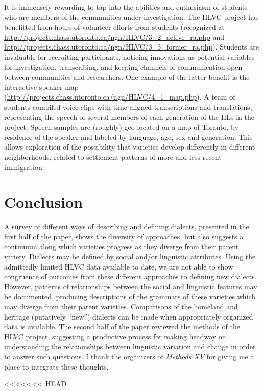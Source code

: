 \documentclass[output=paper]{LSP/langsci}
\begin{document}
It is immensely rewarding to tap into the abilities and enthusiasm of students who are members of the communities under investigation. The HLVC project has benefitted from hours of volunteer efforts from students (recognized at \url{http://projects.chass.utoronto.ca/ngn/HLVC/3_2_active_ra.php} and \url{http://projects.chass.utoronto.ca/ngn/HLVC/3_3_former_ra.php}). Students are invaluable for recruiting participants, noticing innovations as potential variables for investigation, transcribing, and keeping channels of communication open between communities and researchers. One example of the latter benefit is the interactive speaker map (\url{http://projects.chass.utoronto.ca/ngn/HLVC/4_1_map.php}). A team of students compiled voice clips with time-aligned transcriptions and translations, representing the speech of several members of each generation of the HLs in the project. Speech samples are (roughly) geo-located on a map of Toronto, by residence of the speaker and labeled by language, age, sex and generation. This allows exploration of the possibility that varieties develop differently in different neighborhoods, related to settlement patterns of more and less recent immigration. 

\section{Conclusion}
A survey of different ways of describing and defining dialects, presented in the first half of the paper, shows the diversity of approaches, but also suggests a continuum along which varieties progress as they diverge from their parent variety. Dialects may be defined by social and/or linguistic attributes. Using the admittedly limited HLVC data available to date, we are not able to show congruence of outcomes from these different approaches to defining new dialects. However, patterns of relationships between the social and linguistic features may be documented, producing descriptions of the grammars of these varieties which may diverge from their parent varieties. Comparisons of the homeland and heritage (putatively “new”) dialects can be made when appropriately organized data is available. The second half of the paper reviewed the methods of the HLVC project, suggesting a productive process for making headway on understanding the relationships between linguistic variation and change in order to answer such questions. I thank the organizers of \textit{Methods XV} for giving me a place to integrate these thoughts. 

\printbibliography[heading=subbibliography,notkeyword=this]
<<<<<<< HEAD
\end{document}
